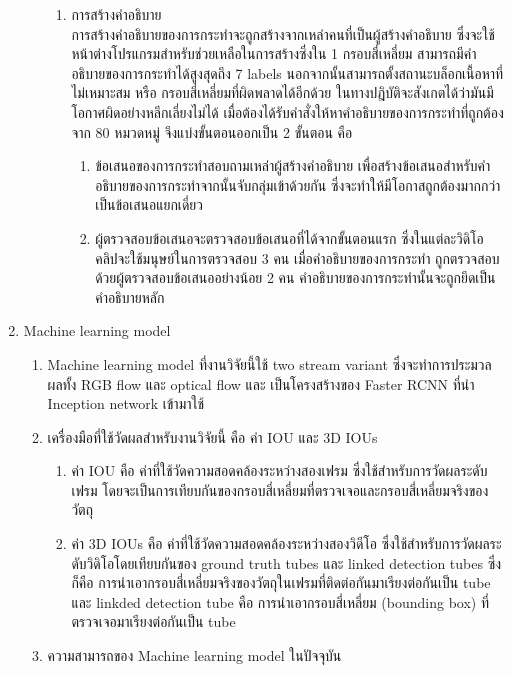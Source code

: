 \begin{enumerate}
\begin{enumerate}
\begin{enumerate}
%
		\item การสร้างคำอธิบาย
\\
		การสร้างคำอธิบายของการกระทำจะถูกสร้างจากเหล่าคนที่เป็นผู้สร้างคำอธิบาย ซึ่งจะใช้หน้าต่างโปรแกรมสำหรับช่วยเหลือในการสร้างซึ่งใน 1 กรอบสี่เหลี่ยม สามารถมีคำอธิบายของการกระทำได้สูงสุดถึง 7 labels นอกจากนั้นสามารถตั้งสถานะบล็อกเนื้อหาที่ไม่เหมาะสม หรือ กรอบสี่เหลี่ยมที่ผิดพลาดได้อีกด้วย ในทางปฎิบัติจะสังเกตได้ว่ามันมีโอกาศผิดอย่างหลีกเลี่ยงไม่ได้ เมื่อต้องได้รับคำสั่งให้หาคำอธิบายของการกระทำที่ถูกต้องจาก 80 หมวดหมู่ จึงแบ่งขั้นตอนออกเป็น 2 ขั้นตอน คือ
		\begin{enumerate}
			\item ข้อเสนอของการกระทำสอบถามเหล่าผู้สร้างคำอธิบาย เพื่อสร้างข้อเสนอสำหรับคำอธิบายของการกระทำจากนั้นจับกลุ่มเข้าด้วยกัน ซึ่งจะทำให้มีโอกาสถูกต้องมากกว่าเป็นข้อเสนอแยกเดี่ยว
			\setlength\itemsep{-0.25em}
			\item ผู้ตรวจสอบข้อเสนอจะตรวจสอบข้อเสนอที่ได้จากขั้นตอนแรก ซึ่งในแต่ละวิดิโอคลิปจะใช้มนุษย์ในการตรวจสอบ 3 คน เมื่อคำอธิบายของการกระทำ ถูกตรวจสอบด้วยผู้ตรวจสอบข้อเสนออย่างน้อย 2 คน คำอธิบายของการกระทำนั้นจะถูกยึดเป็นคำอธิบายหลัก
		\end{enumerate}
	\end{enumerate}
	\end{enumerate}
	\item {Machine learning model}
	\begin{enumerate}
		\item Machine learning model ที่งานวิจัยนี้ใช้ two stream variant ซึ่งจะทำการประมวลผลทั้ง RGB flow และ optical flow และ เป็นโครงสร้างของ Faster RCNN ที่นำ Inception network เข้ามาใช้ 
		\item เครื่องมือที่ใช้วัดผลสำหรับงานวิจัยนี้ คือ ค่า IOU และ 3D IOUs 
		\begin{enumerate}
			\item ค่า IOU คือ ค่าที่ใช้วัดความสอดคล้องระหว่างสองเฟรม ซึ่งใช้สำหรับการวัดผลระดับเฟรม โดยจะเป็นการเทียบกันของกรอบสี่เหลี่ยมที่ตรวจเจอและกรอบสี่เหลี่ยมจริงของวัตถุ
			\item ค่า 3D IOUs คือ ค่าที่ใช้วัดความสอดคล้องระหว่างสองวิดีโอ ซึ่งใช้สำหรับการวัดผลระดับวิดิโอโดยเทียบกันของ ground truth tubes และ linked detection tubes  ซึ่งก็คือ การนำเอากรอบสี่เหลี่ยมจริงของวัตถุในเฟรมที่ติดต่อกันมาเรียงต่อกันเป็น tube และ linkded detection tube คือ การนำเอากรอบสี่เหลี่ยม (bounding box) ที่ตรวจเจอมาเรียงต่อกันเป็น tube
		\end{enumerate}	
		\item ความสามารถของ Machine learning model ในปัจจุบัน
		\begin{enumerate}

\end{enumerate}
\end{enumerate}
\end{enumerate}
